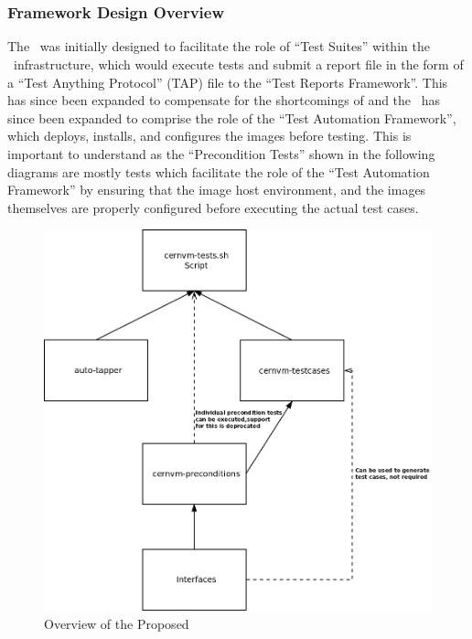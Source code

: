 \chapter{\cernvmtestframework}
\subsection{Framework Design Overview}
\label{sct:frameworkoverview}

The \cernvmtestframework\ was initially designed to facilitate the role of ``Test Suites'' within the \releasetesting~infrastructure, which would 
execute tests and submit a report file in the form of a ``Test Anything Protocol'' (TAP) file to the ``Test Reports Framework''. This has since been
expanded to compensate for the shortcomings of \tapper and the \cernvmtestframework\ has since been expanded to comprise the role of the ``Test
Automation Framework'', which deploys, installs, and configures the \cernvm images before testing. This is important to understand as the 
``Precondition Tests'' shown in the following diagrams are mostly tests which facilitate the role of the ``Test Automation Framework'' by ensuring
that the \cernvm image host environment, and the images themselves are properly configured before executing the actual \cernvmreleasetesting test
cases.

\begin{figure}[!hbp]
	\begin{center}
		\includegraphics[scale=0.19]{img/proposed_framework.png}
	\end{center}
	\caption{Overview of the Proposed \cernvmtestframework}
	\label{fig:proposedarchitecture}
\end{figure}

